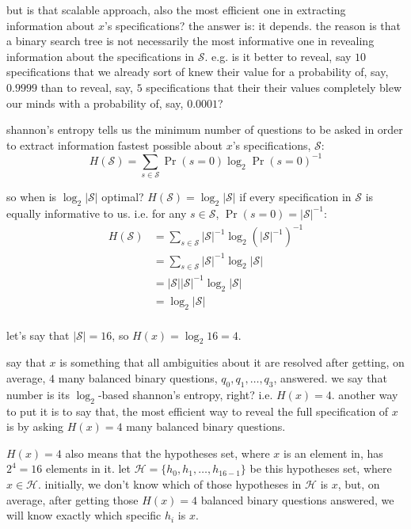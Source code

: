\documentclass[twocolumn]{article}
\begin{document}
but is that scalable approach, also the most efficient one in extracting
information about $x$'s specifications?  the answer is: it depends.  the
reason is that a binary search tree is not necessarily the most informative
one in revealing information about the specifications in $\mathcal{S}$.
e.g. is it better to reveal, say $10$ specifications that we already sort
of knew their value for a probability of, say, $0.9999$ than to reveal,
say, $5$ specifications that their their values completely blew our minds
with a probability of, say, $0.0001$?

shannon's entropy tells us the minimum number of questions to be asked in
order to extract information fastest possible about $x$'s specifications,
$\mathcal{S}$:
\begin{equation}
    H(\mathcal{S}) = \sum_{s \in \mathcal{S}}
        \Pr(s=0) \log_2 \Pr(s=0)^{-1}
\end{equation}

so when is $\log_2 |\mathcal{S}|$ optimal?  $H(\mathcal{S}) = \log_2
|\mathcal{S}|$ if every specification in $\mathcal{S}$ is equally
informative to us.  i.e.  for any $s \in \mathcal{S}$, $\Pr(s=0) =
|\mathcal{S}|^{-1}$:
\begin{equation}
\begin{split}
    H(\mathcal{S}) 
    &= \sum_{s \in \mathcal{S}} |\mathcal{S}|^{-1} \log_2
        (|\mathcal{S}|^{-1})^{-1} \\
    &= \sum_{s \in \mathcal{S}} |\mathcal{S}|^{-1} \log_2
        |\mathcal{S}| \\
    &= |\mathcal{S}| |\mathcal{S}|^{-1} \log_2 |\mathcal{S}| \\
    &= \log_2 |\mathcal{S}| \\
\end{split}
\end{equation}

let's say that $|\mathcal{S}| = 16$, so $H(x) = \log_2 16 = 4$.

say that $x$ is something that all ambiguities about it are resolved after
getting, on average, $4$ many balanced binary questions, $q_0, q_1, \ldots,
q_3$, answered.  we say that number is its $\log_2$-based shannon's
entropy, right?  i.e. $H(x) = 4$.  another way to put it is to say that,
the most efficient way to reveal the full specification of $x$ is by asking
$H(x)=4$ many balanced binary questions.

$H(x) = 4$ also means that the hypotheses set, where $x$ is an element in,
has $2^4=16$ elements in it.  let $\mathcal{H} = \{h_0, h_1, \ldots,
h_{16-1}\}$ be this hypotheses set, where $x \in \mathcal{H}$.  initially,
we don't know which of those hypotheses in $\mathcal{H}$ is $x$, but, on
average, after getting those $H(x) = 4$ balanced binary questions answered,
we will know exactly which specific $h_i$ is $x$.
\end{document}

